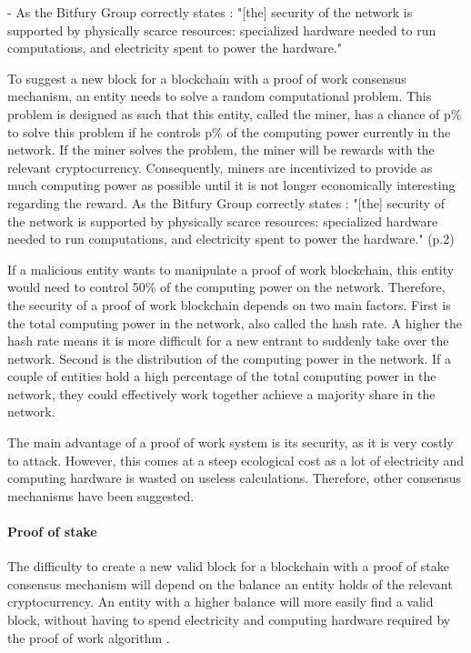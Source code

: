 - As the Bitfury Group correctly states \cite{bitfury-pos-vs-pow}: "[the] security of the network is supported by physically scarce resources: specialized hardware needed to run computations, and electricity spent to power the hardware." 
\fi

To suggest a new block for a blockchain with a proof of work consensus mechanism, an entity needs to solve a random computational problem. This problem is designed as such that this entity, called the miner, has a chance of p\% to solve this problem if he controls p\% of the computing power currently in the network. If the miner solves the problem, the miner will be rewards with the relevant cryptocurrency. Consequently, miners are incentivized to provide as much computing power as possible until it is not longer economically interesting regarding the reward. As the Bitfury Group correctly states \cite{bitfury-pos-vs-pow}: "[the] security of the network is supported by physically scarce resources: specialized hardware needed to run computations, and electricity spent to power the hardware." (p.2)

If a malicious entity wants to manipulate a proof of work blockchain, this entity would need to control 50\% of the computing power on the network. Therefore, the security of a proof of work blockchain depends on two main factors. First is the total computing power in the network, also called the hash rate. A higher the hash rate means it is more difficult for a new entrant to suddenly take over the network. Second is the distribution of the computing power in the network. If a couple of entities hold a high percentage of the total computing power in the network, they could effectively work together achieve a majority share in the network.

The main advantage of a proof of work system is its security, as it is very costly to attack. However, this comes at a steep ecological cost as a lot of electricity and computing hardware is wasted on useless calculations. Therefore, other consensus mechanisms have been suggested.

\paragraph{Proof of stake}

The difficulty to create a new valid block for a blockchain with a proof of stake consensus mechanism will depend on the balance an entity holds of the relevant cryptocurrency. An entity with a higher balance will more easily find a valid block, without having to spend electricity and computing hardware required by the proof of work algorithm \cite{bitfury-pos-vs-pow}.

